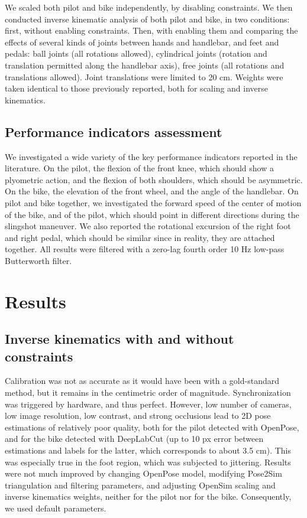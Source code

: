 We scaled both pilot and bike independently, by disabling constraints. We then conducted inverse kinematic analysis of both pilot and bike, in two conditions: first, without enabling constraints. Then, with enabling them and comparing the effects of several kinds of joints between hands and handlebar, and feet and pedals: ball joints (all rotations allowed), cylindrical joints (rotation and translation permitted along the handlebar axis), free joints (all rotations and translations allowed). Joint translations were limited to 20 cm. Weights were taken identical to those previously reported, both for scaling and inverse kinematics. 


\subsection{Performance indicators assessment}
We investigated a wide variety of the key performance indicators reported in the literature. On the pilot, the flexion of the front knee, which should show a plyometric action, and the flexion of both shoulders, which should be asymmetric. On the bike, the elevation of the front wheel, and the angle of the handlebar. On pilot and bike together, we investigated the forward speed of the center of motion of the bike, and of the pilot, which should point in different directions during the slingshot maneuver. We also reported the rotational excursion of the right foot and right pedal, which should be similar since in reality, they are attached together. All results were filtered with a zero-lag fourth order 10 Hz low-pass Butterworth filter.


\section{Results}
\subsection{Inverse kinematics with and without constraints}
Calibration was not as accurate as it would have been with a gold-standard method, but it remains in the centimetric order of magnitude. Synchronization was triggered by hardware, and thus perfect. However, low number of cameras, low image resolution, low contrast, and strong occlusions lead to 2D pose estimations of relatively poor quality, both for the pilot detected with OpenPose, and for the bike detected with DeepLabCut (up to 10 px error between estimations and labels for the latter, which corresponds to about 3.5 cm). This was especially true in the foot region, which was subjected to jittering. Results were not much improved by changing OpenPose model, modifying Pose2Sim triangulation and filtering parameters, and adjusting OpenSim scaling and inverse kinematics weights, neither for the pilot nor for the bike. Consequently, we used default parameters. 

